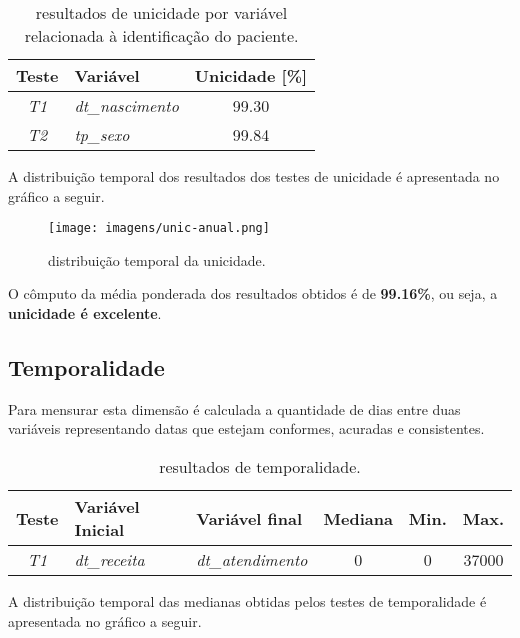 \documentclass[
  12,
  table]{proadi}
\begin{document}
\begin{table}[H]

\caption{\label{tab:unnamed-chunk-19}resultados de unicidade por variável relacionada à identificação do paciente.}
\centering
\fontsize{10}{12}\selectfont
\begin{tabular}[t]{>{}c>{}lc}
\toprule
Teste & Variável & Unicidade [\%]\\
\midrule
\em{T1} & \em{dt\_nascimento} & 99.30\\
\em{T2} & \em{tp\_sexo} & 99.84\\
\bottomrule
\end{tabular}
\end{table}

A distribuição temporal dos resultados dos testes de unicidade é
apresentada no gráfico a seguir.

\begin{figure}
\centering
\texttt{[image: imagens/unic-anual.png]}
\caption{distribuição temporal da unicidade.}
\end{figure}

O cômputo da média ponderada dos resultados obtidos é de
\textbf{99.16\%}, ou seja, a \textbf{unicidade é excelente}.

\hypertarget{temporalidade}{%
\subsection{Temporalidade}\label{temporalidade}}

Para mensurar esta dimensão é calculada a quantidade de dias entre duas
variáveis representando datas que estejam conformes, acuradas e
consistentes.

\begin{table}[H]

\caption{\label{tab:unnamed-chunk-20}resultados de temporalidade.}
\centering
\fontsize{10}{12}\selectfont
\begin{tabular}[t]{>{}c>{}l>{}lccc}
\toprule
Teste & Variável Inicial & Variável final & Mediana & Min. & Max.\\
\midrule
\em{T1} & \em{dt\_receita} & \em{dt\_atendimento} & 0 & 0 & 37000\\
\bottomrule
\end{tabular}
\end{table}

A distribuição temporal das medianas obtidas pelos testes de
temporalidade é apresentada no gráfico a seguir.
\end{document}
